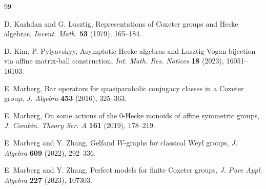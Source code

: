 \documentclass[11pt]{article}
\begin{document}
\begin{thebibliography}{99}

 D. Kazhdan and G. Lusztig, Representations of Coxeter groups and Hecke algebras, \emph{Invent. Math.} \textbf{53} (1979), 165--184.

 D. Kim, P. Pylyavskyy, Asymptotic Hecke algebras and Lusztig-Vogan bijection via affine matrix-ball construction, \emph{Int. Math. Res. Notices} \textbf{18} (2023), 16051--16103.



%

%
%

 E. Marberg, Bar operators for quasiparabolic conjugacy classes in a Coxeter group,
\emph{J. Algebra} \textbf{453} (2016), 325--363.

 E. Marberg, On some actions of the $0$-Hecke monoids of affine symmetric groups, 
\emph{J. Combin. Theory Ser. A} \textbf{161} (2019), 178--219.

 E. Marberg and Y. Zhang, Gelfand $W$-graphs for classical Weyl groups, \emph{J. Algebra} \textbf{609} (2022), 292--336.

 E. Marberg and Y. Zhang, Perfect models for finite Coxeter groups, \emph{J. Pure Appl. Algebra} \textbf{227} (2023), 107303.


\end{thebibliography}
\end{document}
